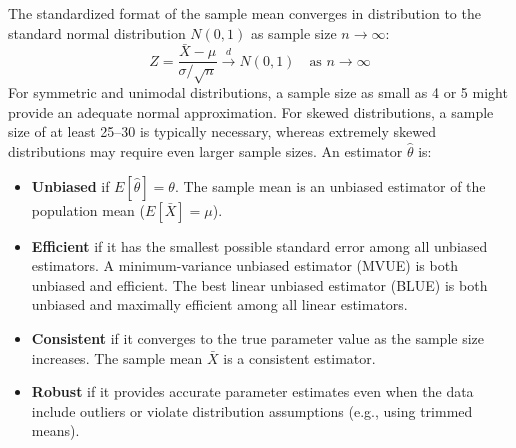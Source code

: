 The standardized format of the sample mean converges in distribution to the standard normal distribution $N(0,1)$ as sample size $n \to \infty$:
\begin{equation}
	Z = \frac{\bar{X} - \mu}{\sigma / \sqrt{n}} \xrightarrow{d} N(0, 1) \quad \text{as } n \to \infty
	\label{eq:clt_standardized_m7}
\end{equation}
For symmetric and unimodal distributions, a sample size as small as 4 or 5 might provide an adequate normal approximation. For skewed distributions, a sample size of at least 25--30 is typically necessary, whereas extremely skewed distributions may require even larger sample sizes.
An estimator $\hat{\theta}$ is:
\begin{itemize}
	\item \textbf{Unbiased} if $E[\hat{\theta}] = \theta$. The sample mean is an unbiased estimator of the population mean ($E[\bar{X}] = \mu$).
	\item \textbf{Efficient} if it has the smallest possible standard error among all unbiased estimators. A minimum-variance unbiased estimator (MVUE) is both unbiased and efficient. The best linear unbiased estimator (BLUE) is both unbiased and maximally efficient among all linear estimators.
	\item \textbf{Consistent} if it converges to the true parameter value as the sample size increases. The sample mean $\bar{X}$ is a consistent estimator.
	\item \textbf{Robust} if it provides accurate parameter estimates even when the data include outliers or violate distribution assumptions (e.g., using trimmed means).
\end{itemize}
